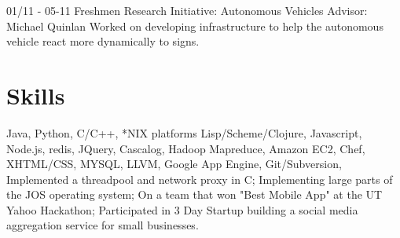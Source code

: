 \documentclass[11pt,letter,sans]{moderncv}
\begin{document}
\cventry
{01/11 - 05-11}
{Freshmen Research Initiative: Autonomous Vehicles}
{Advisor: Michael Quinlan}
{}
{}
{Worked on developing infrastructure to help the autonomous vehicle react more
dynamically to signs.} 

\section{Skills}
{Java, Python, C/C++, *NIX platforms}
{Lisp/Scheme/Clojure, Javascript, Node.js, redis, JQuery, Cascalog, Hadoop Mapreduce,
Amazon EC2, Chef, XHTML/CSS, MYSQL, LLVM, Google App Engine, Git/Subversion, }
{Implemented a threadpool and network proxy in C; Implementing large parts of
  the JOS operating system; On a team that won "Best Mobile App" at the UT
  Yahoo Hackathon; Participated in 3 Day Startup building a social media
aggregation service for small businesses.}
\end{document}
